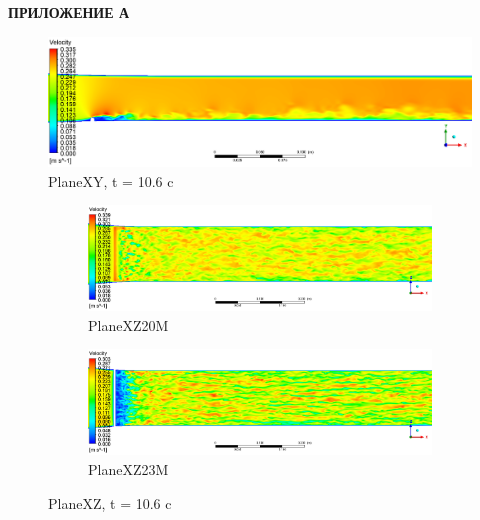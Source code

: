 \newpage
\begin{flushright}
	\MakeUppercase{\textbf{Приложение А}}
\end{flushright}
\begin{figure}[H]
	\centering
	\includegraphics[width=0.9\linewidth]{../Assets/T1060_Velocity_ContourXY}
	\caption{PlaneXY, t = 10.6 c}
	\label{fig:t1060velocitycontourxy}
\end{figure}
\begin{figure}[H]
	\begin{subfigure}{.5\textwidth}
		\centering
		\includegraphics[width=1.7\linewidth, angle=90]{../Assets/T1060_Velocity_ContourXZ20M}
		\caption{PlaneXZ20M}
		\label{fig:t1060velocitycontourxz20m}
	\end{subfigure}%
	\begin{subfigure}{.5\textwidth}
		\centering
		\includegraphics[width=1.7\linewidth, angle=90]{../Assets/T1060_Velocity_ContourXZ23M}
		\caption{PlaneXZ23M}
		\label{fig:t1060velocitycontourxz23m}
	\end{subfigure}
	\caption{PlaneXZ, t = 10.6 c}
	\label{fig:t1060velocitycontourxz}
\end{figure}